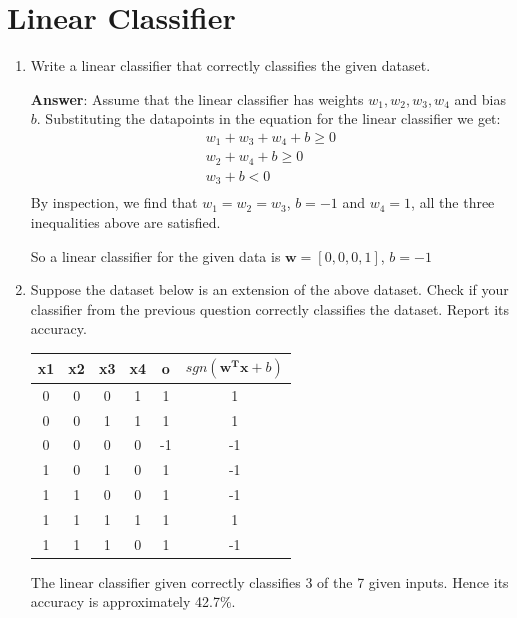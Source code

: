 \documentclass{article}
\begin{document}
\section{Linear Classifier}
\begin{enumerate}
    \item Write a linear classifier that correctly classifies the given dataset.
    
    \textbf{Answer}: Assume that the linear classifier has weights $w_1, w_2, w_3, w_4$ and bias $b$. Substituting the datapoints in the equation for the linear classifier we get:
    \begin{align*}
        w_1 + w_3 + w_4 + b \geq 0 \\
        w_2 + w_4 + b \geq 0 \\
        w_3 + b < 0 \\
    \end{align*}
    By inspection, we find that $w_1 = w_2 = w_3$, $b = -1$ and $w_4 = 1$, all the three inequalities above are satisfied.
    
    So a linear classifier for the given data is $\textbf{w} = [0, 0, 0, 1]$, $b = -1$
    
    \item Suppose the dataset below is an extension of the above dataset. Check if your classifier from the previous question correctly classifies the dataset. Report its accuracy.

        \begin{table}[h]
        \centering
        \begin{tabular}{cccc|c|c}
            x1 & x2 & x3 & x4 & o & $sgn(\mathbf{w^Tx} + b)$ \\ \hline
            0  & 0  & 0  & 1  & 1 & 1 \\
            0  & 0  & 1  & 1  & 1 & 1 \\
            0  & 0  & 0  & 0  & -1 & -1\\
            1  & 0  & 1  & 0  & 1 & -1 \\
            1  & 1  & 0  & 0  & 1 & -1 \\
            1  & 1  & 1  & 1  & 1 & 1 \\
            1  & 1  & 1  & 0  & 1 & -1 \\
        \end{tabular}
        \end{table}
    The linear classifier given correctly classifies 3 of the 7 given inputs. Hence its accuracy is approximately 42.7\%.
    

\end{enumerate}
\end{document}
